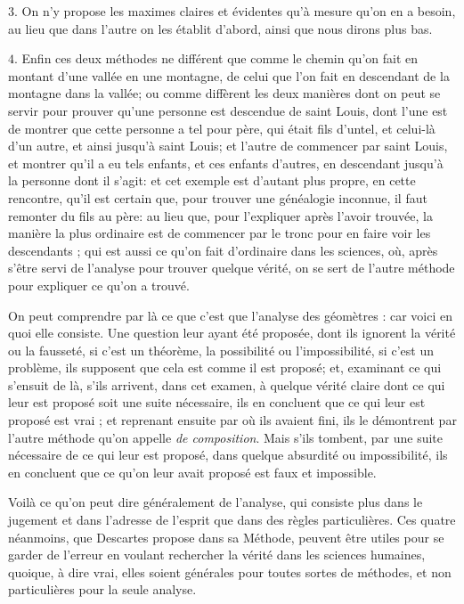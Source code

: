 $3$. On n'y propose les maximes claires et évidentes qu'à mesure qu'on en a besoin, au lieu que dans l'autre on les établit d'abord, ainsi que nous dirons plus bas.

$4$. Enfin ces deux méthodes ne différent que comme le chemin qu'on fait en montant d'une vallée en une montagne, de celui que l'on fait en descendant de la montagne dans la vallée; ou comme diffèrent les deux manières dont on peut se servir pour prouver qu'une personne est descendue de saint Louis, dont l'une est de montrer que cette personne a tel pour père, qui était fils d'untel, et celui-là d'un autre, et ainsi jusqu'à saint Louis; et l'autre de commencer par saint Louis, et montrer qu'il a eu tels enfants, et ces enfants d'autres, en descendant jusqu'à la personne dont il s'agit: et cet exemple est d'autant plus propre, en cette rencontre, qu'il est certain que, pour trouver une généalogie inconnue, il faut remonter du fils au père: au lieu que, pour l'expliquer après l'avoir trouvée, la manière la plus ordinaire est de commencer par le tronc pour en faire voir les descendants ; qui est aussi ce qu'on fait d'ordinaire dans les sciences, où, après s'être servi de l'analyse pour trouver quelque vérité, on se sert de l'autre méthode pour expliquer ce qu'on a trouvé.

On peut comprendre par là ce que c'est que l'analyse des géomètres : car voici en quoi elle consiste. Une question leur ayant été proposée, dont ils ignorent la vérité ou la fausseté, si c'est un théorème, la possibilité ou l'impossibilité, si c'est un problème, ils supposent que cela est comme il est proposé; et, examinant ce qui s'ensuit de là, s'ils arrivent, dans cet examen, à quelque vérité claire dont ce qui leur est proposé soit une suite nécessaire, ils en concluent que ce qui leur est proposé est vrai ; et reprenant ensuite par où ils avaient fini, ils le démontrent par l'autre méthode qu'on appelle \emph{de composition}. Mais s'ils tombent, par une suite nécessaire de ce qui leur est proposé, dans quelque absurdité ou impossibilité, ils en concluent que ce qu'on leur avait proposé est faux et impossible.

Voilà ce qu'on peut dire généralement de l'analyse, qui consiste plus dans le jugement et dans l'adresse de l'esprit que dans des règles particulières. Ces quatre néanmoins, que Descartes propose dans sa Méthode, peuvent être utiles pour se garder de l'erreur en voulant rechercher la vérité dans les sciences humaines, quoique, à dire vrai, elles soient générales pour toutes sortes de méthodes, et non particulières pour la seule analyse.

